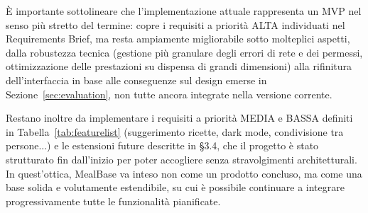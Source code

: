 \documentclass[11pt,a4paper]{article}
\begin{document}
È importante sottolineare che l'implementazione attuale rappresenta un MVP nel senso più stretto del termine: copre i requisiti a priorità ALTA individuati nel Requirements Brief, ma resta ampiamente migliorabile sotto molteplici aspetti, dalla robustezza tecnica (gestione più granulare degli errori di rete e dei permessi, ottimizzazione delle prestazioni su dispensa di grandi dimensioni) alla rifinitura dell'interfaccia in base alle conseguenze sul design emerse in Sezione~\ref{sec:evaluation}, non tutte ancora integrate nella versione corrente. 

Restano inoltre da implementare i requisiti a priorità MEDIA e BASSA definiti in Tabella~\ref{tab:featurelist} (suggerimento ricette, dark mode, condivisione tra persone...) e le estensioni future descritte in \S3.4, che il progetto è stato strutturato fin dall'inizio per poter accogliere senza stravolgimenti architetturali. In quest'ottica, MealBase va inteso non come un prodotto concluso, ma come una base solida e volutamente estendibile, su cui è possibile continuare a integrare progressivamente tutte le funzionalità pianificate.
\end{document}
